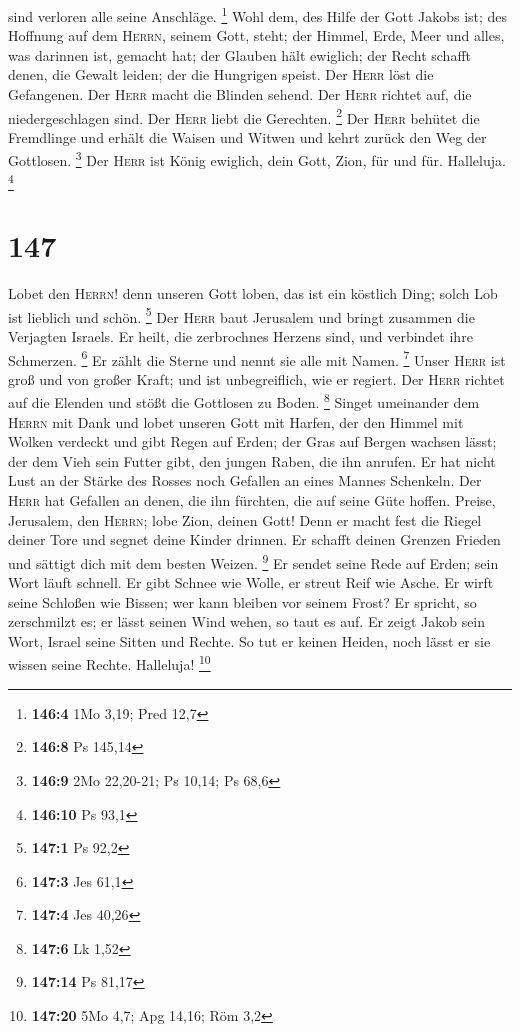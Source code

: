 sind verloren alle seine Anschläge. \footnote{\textbf{146:4} 1Mo 3,19;
  Pred 12,7}  Wohl dem, des Hilfe der Gott Jakobs ist; des
Hoffnung auf dem \textsc{Herrn}, seinem Gott, steht;  der
Himmel, Erde, Meer und alles, was darinnen ist, gemacht hat; der Glauben
hält ewiglich;  der Recht schafft denen, die Gewalt
leiden; der die Hungrigen speist. Der \textsc{Herr} löst die Gefangenen.
 Der \textsc{Herr} macht die Blinden sehend. Der
\textsc{Herr} richtet auf, die niedergeschlagen sind. Der \textsc{Herr}
liebt die Gerechten. \footnote{\textbf{146:8} Ps 145,14} 
Der \textsc{Herr} behütet die Fremdlinge und erhält die Waisen und
Witwen und kehrt zurück den Weg der Gottlosen. \footnote{\textbf{146:9}
  2Mo 22,20-21; Ps 10,14; Ps 68,6}  Der \textsc{Herr} ist
König ewiglich, dein Gott, Zion, für und für. Halleluja. \footnote{\textbf{146:10}
  Ps 93,1}

\hypertarget{section-46}{%
\section{147}\label{section-46}}

 Lobet den \textsc{Herrn}! denn unseren Gott loben, das
ist ein köstlich Ding; solch Lob ist lieblich und schön. \footnote{\textbf{147:1}
  Ps 92,2}  Der \textsc{Herr} baut Jerusalem und bringt
zusammen die Verjagten Israels.  Er heilt, die zerbrochnes
Herzens sind, und verbindet ihre Schmerzen. \footnote{\textbf{147:3} Jes
  61,1}  Er zählt die Sterne und nennt sie alle mit Namen.
\footnote{\textbf{147:4} Jes 40,26}  Unser \textsc{Herr}
ist groß und von großer Kraft; und ist unbegreiflich, wie er regiert.
 Der \textsc{Herr} richtet auf die Elenden und stößt die
Gottlosen zu Boden. \footnote{\textbf{147:6} Lk 1,52} 
Singet umeinander dem \textsc{Herrn} mit Dank und lobet unseren Gott mit
Harfen,  der den Himmel mit Wolken verdeckt und gibt Regen
auf Erden; der Gras auf Bergen wachsen lässt;  der dem
Vieh sein Futter gibt, den jungen Raben, die ihn anrufen.
 Er hat nicht Lust an der Stärke des Rosses noch Gefallen
an eines Mannes Schenkeln.  Der \textsc{Herr} hat
Gefallen an denen, die ihn fürchten, die auf seine Güte hoffen.
 Preise, Jerusalem, den \textsc{Herrn}; lobe Zion, deinen
Gott!  Denn er macht fest die Riegel deiner Tore und
segnet deine Kinder drinnen.  Er schafft deinen Grenzen
Frieden und sättigt dich mit dem besten Weizen. \footnote{\textbf{147:14}
  Ps 81,17}  Er sendet seine Rede auf Erden; sein Wort
läuft schnell.  Er gibt Schnee wie Wolle, er streut Reif
wie Asche.  Er wirft seine Schloßen wie Bissen; wer kann
bleiben vor seinem Frost?  Er spricht, so zerschmilzt es;
er lässt seinen Wind wehen, so taut es auf.  Er zeigt
Jakob sein Wort, Israel seine Sitten und Rechte.  So tut
er keinen Heiden, noch lässt er sie wissen seine Rechte. Halleluja!
\footnote{\textbf{147:20} 5Mo 4,7; Apg 14,16; Röm 3,2}


